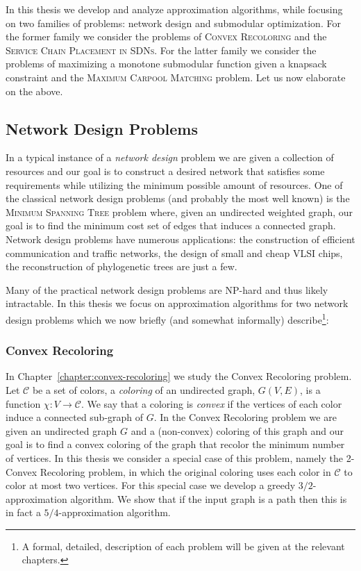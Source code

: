 In this thesis we develop and analyze approximation algorithms, while focusing on two families of problems: network design and submodular optimization.
For the former family we consider the problems of \textsc{Convex Recoloring} and the \textsc{Service Chain Placement in SDNs}.
For the latter family we consider the problems of maximizing a monotone submodular function given a knapsack constraint and the \textsc{Maximum Carpool Matching} problem.
Let us now elaborate on the above.

\subsection*{Network Design Problems}
In a typical instance of a \emph{network design} problem we are given a collection of resources and our goal is to construct a desired network that satisfies some requirements while utilizing the minimum possible amount of resources.
One of the classical network design problems (and probably the most well known) is the \textsc{Minimum Spanning Tree} problem where, given an undirected weighted graph, our goal is to find the minimum cost set of edges that induces a connected graph.
Network design problems have numerous applications: the construction of efficient communication and traffic networks, the design of small and cheap VLSI chips, the reconstruction of phylogenetic trees are just a few.

Many of the practical network design problems are NP-hard and thus likely intractable. 
In this thesis we focus on approximation algorithms for two network design problems which we now briefly (and somewhat informally) describe\footnote{A formal, detailed, description of each problem will be given at the relevant chapters.}:


\subsubsection*{Convex Recoloring} 
In Chapter~\ref{chapter:convex-recoloring} we study the Convex Recoloring problem.
Let $\mathcal{C}$ be a set of colors, a \emph{coloring} of an undirected graph, $G(V, E)$, is a function $\chi:V \to \mathcal{C}$.
We say that a coloring is \emph{convex} if the vertices of each color induce a connected sub-graph of $G$.
In the Convex Recoloring problem we are given an undirected graph $G$ and a (non-convex) coloring of this graph and our goal is to find a convex coloring of the graph that recolor the minimum number of vertices.
In this thesis we consider a special case of this problem, namely the 2-Convex Recoloring problem, in which the original coloring uses each color in $\mathcal{C}$ to color at most two vertices.
For this special case we develop a greedy $3/2$-approximation algorithm.
We show that if the input graph is a path then this is in fact a $5/4$-approximation algorithm.


